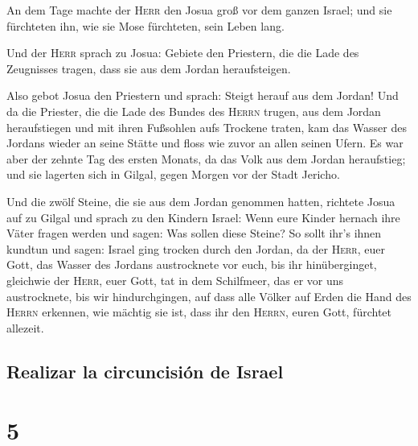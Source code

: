  An dem Tage machte der \textsc{Herr} den Josua groß vor
dem ganzen Israel; und sie fürchteten ihn, wie sie Mose fürchteten, sein
Leben lang.

 Und der \textsc{Herr} sprach zu Josua: 
Gebiete den Priestern, die die Lade des Zeugnisses tragen, dass sie aus
dem Jordan heraufsteigen.

 Also gebot Josua den Priestern und sprach: Steigt herauf
aus dem Jordan!  Und da die Priester, die die Lade des
Bundes des \textsc{Herrn} trugen, aus dem Jordan heraufstiegen und mit
ihren Fußsohlen aufs Trockene traten, kam das Wasser des Jordans wieder
an seine Stätte und floss wie zuvor an allen seinen Ufern.
 Es war aber der zehnte Tag des ersten Monats, da das
Volk aus dem Jordan heraufstieg; und sie lagerten sich in Gilgal, gegen
Morgen vor der Stadt Jericho.

 Und die zwölf Steine, die sie aus dem Jordan genommen
hatten, richtete Josua auf zu Gilgal  und sprach zu den
Kindern Israel: Wenn eure Kinder hernach ihre Väter fragen werden und
sagen: Was sollen diese Steine?  So sollt ihr's ihnen
kundtun und sagen: Israel ging trocken durch den Jordan, 
da der \textsc{Herr}, euer Gott, das Wasser des Jordans austrocknete vor
euch, bis ihr hinüberginget, gleichwie der \textsc{Herr}, euer Gott, tat
in dem Schilfmeer, das er vor uns austrocknete, bis wir hindurchgingen,
 auf dass alle Völker auf Erden die Hand des
\textsc{Herrn} erkennen, wie mächtig sie ist, dass ihr den
\textsc{Herrn}, euren Gott, fürchtet allezeit.

\hypertarget{realizar-la-circuncisiuxf3n-de-israel}{%
\subsection{Realizar la circuncisión de
Israel}\label{realizar-la-circuncisiuxf3n-de-israel}}

\hypertarget{section-4}{%
\section{5}\label{section-4}}

